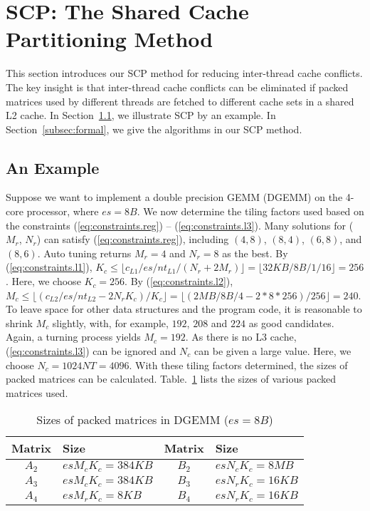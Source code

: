 \section{SCP: The Shared Cache Partitioning Method}\label{sec:scp}

This section introduces our SCP method for reducing
inter-thread cache conflicts.
The key insight is that inter-thread cache conflicts can be eliminated
if packed matrices used by different threads are fetched to different cache sets in a shared L2 cache.
In Section~\ref{subsec:example}, we illustrate 
SCP by an example.  In Section~\ref{subsec:formal},
we give the algorithms in our SCP method.

\subsection{An Example}\label{subsec:example}

Suppose we want to implement a double precision GEMM (DGEMM) on
the 4-core processor, where $es=8B$.
We now determine the tiling factors used based on
the constraints (\ref{eq:constraints.reg}) -- (\ref{eq:constraints.l3}).
Many solutions for ($M_r$, $N_r$) can satisfy (\ref{eq:constraints.reg}), including
$(4,8)$, $(8,4)$, $(6,8)$, and $(8,6)$. Auto
tuning returns
$M_r = 4$ and $N_r = 8$ as the best.
By (\ref{eq:constraints.l1}),
$K_c \le \lfloor c_{L1}/es/nt_{L1}/(N_r + 2 M_r) \rfloor = \lfloor 32KB/8B/1/16 \rfloor = 256$.
Here, we choose $K_c=256$.
By (\ref{eq:constraints.l2}),
$M_c \le \lfloor (c_{L2}/es/nt_{L2} - 2 N_r K_c )/ K_c \rfloor =
\lfloor (2MB/8B/4 - 2*8*256)/256 \rfloor = 240$.
To leave space for other data structures and the program code,
it is reasonable to shrink $M_c$ slightly, with,
for example, $192$, $208$ and $224$ as good
candidates. Again, a turning process yields
$M_c = 192$.
As there is no L3 cache, (\ref{eq:constraints.l3}) can be ignored
and $N_c$ can be given a large value.
Here, we choose $N_c = 1024NT = 4096$.
With these tiling factors determined, the sizes of packed matrices
can be calculated. Table.~\ref{tab:msizes} lists
the sizes of various packed matrices used.

\begin{table}
  \centering
  \caption{Sizes of packed matrices in DGEMM ($es = 8B$)}
  \label{tab:msizes}
  \begin{tabular}{cl|cl}
    \toprule
    Matrix & Size & Matrix & Size \\
    \midrule
    $A_2$ & $es M_c K_c = 384KB$ & $B_2$ & $es N_c K_c = 8MB$ \\
    $A_3$ & $es M_c K_c = 384KB$ & $B_3$ & $es N_r K_c = 16KB$ \\
    $A_4$ & $es M_r K_c = 8KB$   & $B_4$ & $es N_r K_c = 16KB$ \\
    \bottomrule
  \end{tabular}
\end{table}

